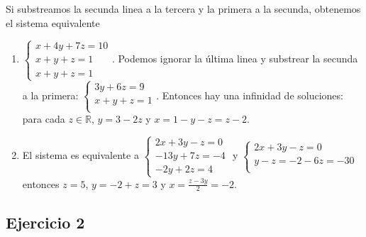 Si substreamos la secunda linea a la tercera y la primera a la secunda,
obtenemos el sistema equivalente

\begin{enumerate}
\item $\left\{
\begin{aligned}
  x + 4y + 7z = 10 \\
  x + y + z = 1 \\
 x + y + z = 1
\end{aligned}\right.$. Podemos ignorar la última linea y substrear la secunda
a la primera: $\left\{
\begin{aligned}
   3y + 6z = 9 \\
  x + y + z = 1 \\
\end{aligned}\right.$. Entonces hay una infinidad de soluciones:
para cada $z \in \mathbb R$, $y = 3 - 2z$ y
$x = 1 - y - z =  z - 2$.

\item El sistema es equivalente a $\left\{
\begin{aligned}
  2x + 3y - z = 0 \\
  -13y + 7z = -4 \\
  -2y + 2z = 4
\end{aligned}\right.$ y $\left\{\begin{aligned}
  2x + 3y - z = 0 \\
  y - z = -2
   -6z = -30 \\
\end{aligned}\right.$ entonces $z = 5$, $y = -2 + z = 3$ y
$x = \frac{z - 3y}{2} = -2$.

\end{enumerate}

\subsection*{Ejercicio 2}

